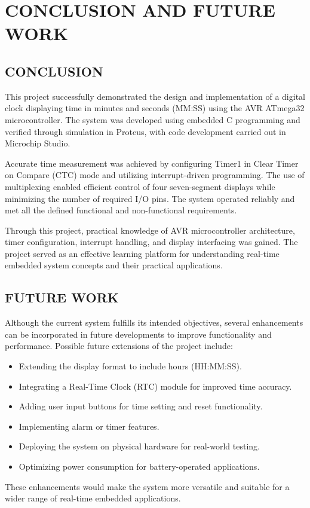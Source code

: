 \chapter{CONCLUSION AND FUTURE WORK}%
\label{chap:conclusion}

\section{CONCLUSION}
This project successfully demonstrated the design and implementation of a digital clock 
displaying time in minutes and seconds (MM:SS) using the AVR ATmega32 microcontroller. The 
system was developed using embedded C programming and verified through simulation in Proteus, 
with code development carried out in Microchip Studio.

Accurate time measurement was achieved by configuring Timer1 in Clear Timer on Compare (CTC) 
mode and utilizing interrupt-driven programming. The use of multiplexing enabled efficient 
control of four seven-segment displays while minimizing the number of required I/O pins. The 
system operated reliably and met all the defined functional and non-functional requirements.

Through this project, practical knowledge of AVR microcontroller architecture, timer 
configuration, interrupt handling, and display interfacing was gained. The project served as 
an effective learning platform for understanding real-time embedded system concepts and their 
practical applications.

\section{FUTURE WORK}
Although the current system fulfills its intended objectives, several enhancements can be 
incorporated in future developments to improve functionality and performance. Possible future 
extensions of the project include:
\begin{itemize}
    \item Extending the display format to include hours (HH:MM:SS).
    \item Integrating a Real-Time Clock (RTC) module for improved time accuracy.
    \item Adding user input buttons for time setting and reset functionality.
    \item Implementing alarm or timer features.
    \item Deploying the system on physical hardware for real-world testing.
    \item Optimizing power consumption for battery-operated applications.
\end{itemize}
\enumitemEndSpacing{}

These enhancements would make the system more versatile and suitable for a wider range of real-time embedded applications.
